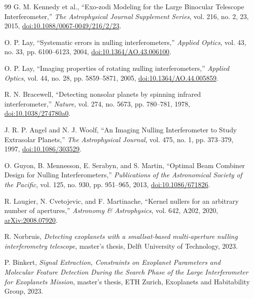\documentclass[12pt,a4paper]{article}
\numberwithin{equation}{section}
\numberwithin{figure}{section}
\numberwithin{table}{section}
\begin{document}
\begin{thebibliography}{99}
G. M. Kennedy et al.,
``Exo-zodi Modeling for the Large Binocular Telescope Interferometer,''
\textit{The Astrophysical Journal Supplement Series}, vol. 216, no. 2, 23, 2015,
\href{https://doi.org/10.1088/0067-0049/216/2/23}{doi:10.1088/0067-0049/216/2/23}.

O. P. Lay,
``Systematic errors in nulling interferometers,''
\textit{Applied Optics}, vol. 43, no. 33, pp. 6100--6123, 2004,
\href{https://doi.org/10.1364/AO.43.006100}{doi:10.1364/AO.43.006100}.

O. P. Lay,
``Imaging properties of rotating nulling interferometers,''
\textit{Applied Optics}, vol. 44, no. 28, pp. 5859--5871, 2005,
\href{https://doi.org/10.1364/AO.44.005859}{doi:10.1364/AO.44.005859}.

R. N. Bracewell,
``Detecting nonsolar planets by spinning infrared interferometer,''
\textit{Nature}, vol. 274, no. 5673, pp. 780--781, 1978,
\href{https://doi.org/10.1038/274780a0}{doi:10.1038/274780a0}.

J. R. P. Angel and N. J. Woolf,
``An Imaging Nulling Interferometer to Study Extrasolar Planets,''
\textit{The Astrophysical Journal}, vol. 475, no. 1, pp. 373--379, 1997,
\href{https://doi.org/10.1086/303529}{doi:10.1086/303529}.

O. Guyon, B. Mennesson, E. Serabyn, and S. Martin,
``Optimal Beam Combiner Design for Nulling Interferometers,''
\textit{Publications of the Astronomical Society of the Pacific}, vol. 125, no. 930, pp. 951--965, 2013,
\href{https://doi.org/10.1086/671826}{doi:10.1086/671826}.

R. Laugier, N. Cvetojevic, and F. Martinache,
``Kernel nullers for an arbitrary number of apertures,''
\textit{Astronomy \& Astrophysics}, vol. 642, A202, 2020,
\href{https://arxiv.org/abs/2008.07920}{arXiv:2008.07920}.

R. Norbruis,
\textit{Detecting exoplanets with a smallsat-based multi-aperture nulling interferometry telescope},
master's thesis, Delft University of Technology, 2023.

P. Binkert,
\textit{Signal Extraction, Constraints on Exoplanet Parameters and Molecular Feature Detection During the Search Phase of the Large Interferometer for Exoplanets Mission},
master's thesis, ETH Zurich, Exoplanets and Habitability Group, 2023.


\end{thebibliography}
\end{document}

